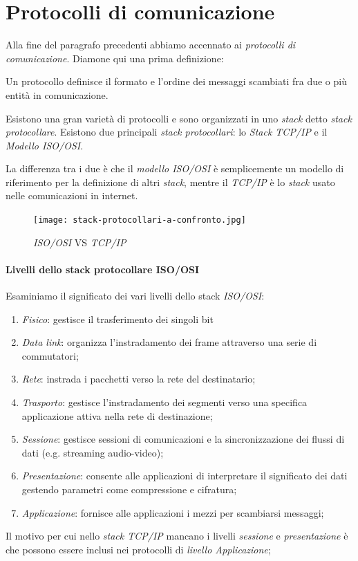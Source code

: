 \section{Protocolli di comunicazione}
Alla fine del paragrafo precedenti abbiamo accennato ai \emph{protocolli di
comunicazione}. Diamone qui una prima definizione:

\begin{definition}[Protocollo]
    Un protocollo definisce il formato e l'ordine dei messaggi scambiati
    fra due o più entità in comunicazione.
\end{definition}\noindent
Esistono una gran varietà di protocolli e sono organizzati in uno \emph{stack}
detto \emph{stack protocollare}. Esistono due principali \emph{stack protocollari}:
lo \emph{Stack TCP/IP} e il \emph{Modello ISO/OSI}.

La differenza tra i due è che il \emph{modello ISO/OSI} è semplicemente un modello
di riferimento per la definizione di altri \emph{stack}, mentre il \emph{TCP/IP} è
lo \emph{stack} usato nelle comunicazioni in internet.

\begin{figure}[h]
    \centering
    \texttt{[image: stack-protocollari-a-confronto.jpg]}
    \caption{\emph{ISO/OSI} VS \emph{TCP/IP}}
\end{figure}

\paragraph{Livelli dello stack protocollare ISO/OSI}
Esaminiamo il significato dei vari livelli dello stack \emph{ISO/OSI}:
\begin{enumerate}
    \item \emph{Fisico}: gestisce il trasferimento dei singoli bit
    \item \emph{Data link}: organizza l'instradamento dei frame attraverso una serie
    di commutatori;
    \item \emph{Rete}: instrada i pacchetti verso la rete del destinatario;
    \item \emph{Trasporto}: gestisce l'instradamento dei segmenti verso una
    specifica applicazione attiva nella rete di destinazione;
    \item \emph{Sessione}: gestisce sessioni di comunicazioni e la sincronizzazione
    dei flussi di dati (e.g. streaming audio-video);
    \item \emph{Presentazione}: consente alle applicazioni di interpretare il
    significato dei dati gestendo parametri come compressione e cifratura;
    \item \emph{Applicazione}: fornisce alle applicazioni i mezzi per scambiarsi
    messaggi;
\end{enumerate}
Il motivo per cui nello \emph{stack TCP/IP} mancano i livelli \emph{sessione} e
\emph{presentazione} è che possono essere inclusi nei protocolli di
\emph{livello Applicazione};

